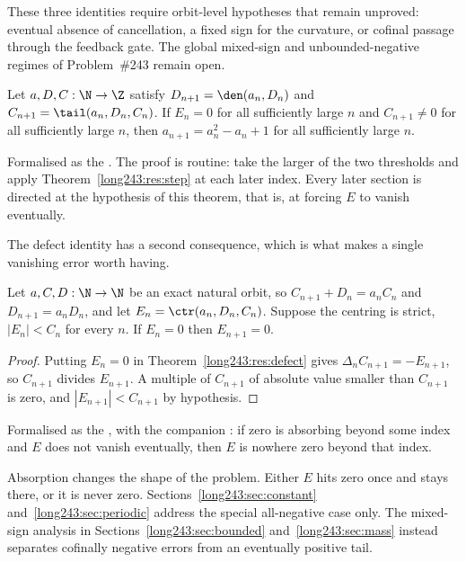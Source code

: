 These three identities require orbit-level hypotheses that remain unproved:
eventual absence of cancellation, a fixed sign for the curvature, or cofinal
passage through the feedback gate.  The global mixed-sign and
unbounded-negative regimes of Problem~\#243 remain open.

\begin{theorem}\label{long243:res:eventual}
Let $a,D,C:\N\to\Z$ satisfy $D_{n+1}=\den(a_n,D_n)$ and
$C_{n+1}=\tail(a_n,D_n,C_n)$.  If $E_n=0$ for all sufficiently large $n$ and
$C_{n+1}\ne0$ for all sufficiently large $n$, then $a_{n+1}=a_n^{2}-a_n+1$ for
all sufficiently large $n$.
\end{theorem}

\noindent Formalised as the
.  The proof is routine: take the larger of the two
thresholds and apply Theorem~\ref{long243:res:step} at each later index.  Every later
section is directed at the hypothesis of this theorem, that is, at forcing $E$
to vanish eventually.

The defect identity has a second consequence, which is what makes a single
vanishing error worth having.

\begin{theorem}\label{long243:res:absorb}
Let $a,C,D:\N\to\N$ be an exact natural orbit, so
$C_{n+1}+D_n=a_nC_n$ and $D_{n+1}=a_nD_n$, and let
$E_n=\ctr(a_n,D_n,C_n)$.  Suppose the centring is strict, $|E_n|<C_n$ for
every $n$.  If $E_n=0$ then $E_{n+1}=0$.
\end{theorem}

\begin{proof}
Putting $E_n=0$ in Theorem~\ref{long243:res:defect} gives
$\Delta_n C_{n+1}=-E_{n+1}$, so $C_{n+1}$ divides $E_{n+1}$.  A multiple of
$C_{n+1}$ of absolute value smaller than $C_{n+1}$ is zero, and
$|E_{n+1}|<C_{n+1}$ by hypothesis.
\end{proof}

\noindent Formalised as the
, with the companion
: if zero is absorbing beyond some index and $E$ does not vanish
eventually, then $E$ is nowhere zero beyond that index.

Absorption changes the shape of the problem.  Either $E$ hits zero once and
stays there, or it is never zero.  Sections~\ref{long243:sec:constant}
and~\ref{long243:sec:periodic} address the special all-negative case only.  The
mixed-sign analysis
in Sections~\ref{long243:sec:bounded} and~\ref{long243:sec:mass} instead separates cofinally
negative errors from an eventually positive tail.

